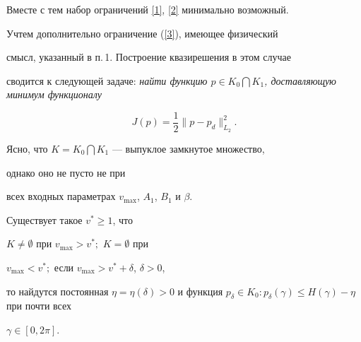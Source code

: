 Вместе с тем набор ограничений \eqref{1}, \eqref{2} минимально возможный.


Учтем дополнительно ограничение (\ref{3}), имеющее физический


смысл, указанный в п.\,1. Построение квазирешения в этом случае


сводится к следующей задаче: {\it найти функцию $p\in K_{0}\bigcap


K_{1}$, доставляющую минимум функционалу}


\begin{equation}


J(p)=\frac{1}{2}\| p - p_{d}\|_{L_{2}}^{2}.


\tag{$P$}


\end{equation}





Ясно, что $K=K_{0}\bigcap K_{1}$ --- выпуклое замкнутое множество,


однако оно не пусто не при


всех входных параметрах $v_{\max}$, $A_{1}$, $B_{1}$ и $\beta$.





\begin{lem}


Существует такое $v^{*}\geq 1$, что


$K\neq\emptyset$ при $v_{\max}> v^{*};$ $K=\emptyset$ при


$v_{\max}<v^{*};$ если $v_{\max}>v^{*}+\delta$, $\delta>0$,


то найдутся постоянная $\eta=\eta(\delta)>0$ и функция $p_{\delta}


\in K_{0}: p_{\delta}(\gamma)\leq H(\gamma)-\eta$ при почти всех


$\gamma \in [0,2\pi]$.


\end{lem}





